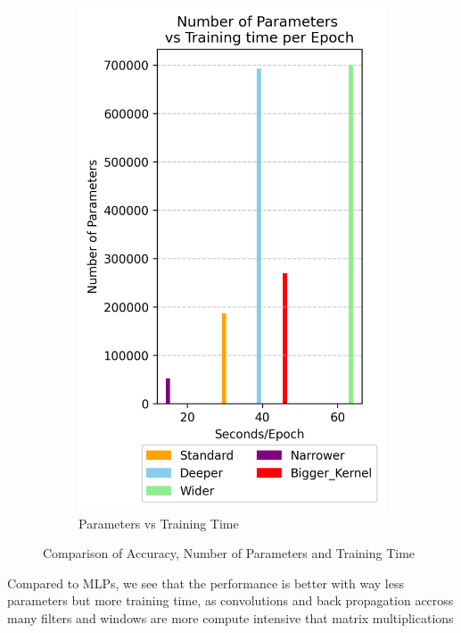 \documentclass{article}
\begin{document}
\begin{figure}[h!]
\begin{subfigure}[t]{0.3\textwidth}
        \includegraphics[width=\textwidth]{./plots/plot15.png}
        \caption{Parameters vs Training Time}
        \label{fig:plot16c}
    \end{subfigure}
    \caption{Comparison of Accuracy, Number of Parameters and Training Time}
    \label{fig:plot16}
\end{figure}

Compared to MLPs, we see that the performance is better with way less parameters but more training time, as convolutions and back propagation accross many filters and windows are more compute intensive that matrix multiplications
\end{document}
